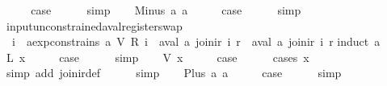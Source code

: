 \begin{isabellebody}
\ \ \isamarkupfalse%
\ \isamarkupfalse%
\ {\isacharquery}case\isanewline
\ \ \ \ \isamarkupfalse%
\ simp\isanewline
{}\isamarkupfalse%
\isanewline
\ \ \isamarkupfalse%
\ {\isacharparenleft}Minus\ a{}\ a{}{\isacharparenright}\isanewline
\ \ \isamarkupfalse%
\ \isamarkupfalse%
\ {\isacharquery}case\isanewline
\ \ \ \ \isamarkupfalse%
\ simp\isanewline
{}\isamarkupfalse%
%
\endisatagproof
{\isafoldproof}%
%
\isadelimproof
\isanewline
%
\endisadelimproof
\isanewline
{}\isamarkupfalse%
\ input{\isacharunderscore}unconstrained{\isacharunderscore}aval{\isacharunderscore}register{\isacharunderscore}swap{\isacharcolon}\isanewline
\ \ {\isachardoublequoteopen}{\isasymforall}i{\isachardot}\ {\isasymnot}\ aexp{\isacharunderscore}constrains\ a\ {\isacharparenleft}V\ {\isacharparenleft}R\ i{\isacharparenright}{\isacharparenright}\ {\isasymLongrightarrow}\ aval\ a\ {\isacharparenleft}join{\isacharunderscore}ir\ i\ r{\isacharparenright}\ {\isacharequal}\ aval\ a\ {\isacharparenleft}join{\isacharunderscore}ir\ i\ r{\isacharprime}{\isacharparenright}{\isachardoublequoteclose}\isanewline
%
\isadelimproof
%
\endisadelimproof
%
\isatagproof
{}\isamarkupfalse%
{\isacharparenleft}induct\ a{\isacharparenright}\isanewline
{}\isamarkupfalse%
\ {\isacharparenleft}L\ x{\isacharparenright}\isanewline
\ \ \isamarkupfalse%
\ \isamarkupfalse%
\ {\isacharquery}case\isanewline
\ \ \ \ \isamarkupfalse%
\ simp\isanewline
{}\isamarkupfalse%
\isanewline
\ \ \isamarkupfalse%
\ {\isacharparenleft}V\ x{\isacharparenright}\isanewline
\ \ \isamarkupfalse%
\ \isamarkupfalse%
\ {\isacharquery}case\isanewline
\ \ \ \ \isamarkupfalse%
\ {\isacharparenleft}cases\ x{\isacharparenright}\isanewline
\ \ \ \ \ \isamarkupfalse%
\ {\isacharparenleft}simp\ add{\isacharcolon}\ join{\isacharunderscore}ir{\isacharunderscore}def{\isacharparenright}\isanewline
\ \ \ \ \isamarkupfalse%
\ simp\isanewline
{}\isamarkupfalse%
\isanewline
\ \ \isamarkupfalse%
\ {\isacharparenleft}Plus\ a{}\ a{}{\isacharparenright}\isanewline
\ \ \isamarkupfalse%
\ \isamarkupfalse%
\ {\isacharquery}case\isanewline
\ \ \ \ \isamarkupfalse%
\ simp\isanewline
{}\isamarkupfalse%

\end{isabellebody}
